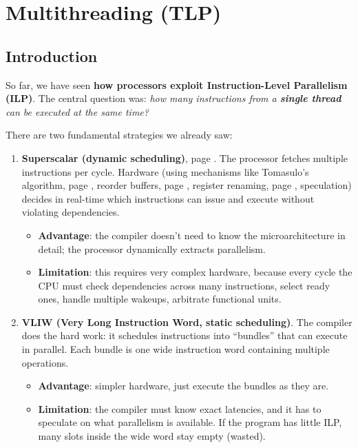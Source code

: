 \section{Multithreading (TLP)}

\subsection{Introduction}

So far, we have seen \textbf{how processors exploit Instruction-Level Parallelism (ILP)}. The central question was: \emph{how many instructions from a \textbf{single thread} can be executed at the same time?}

\highspace
There are two fundamental strategies we already saw:
\begin{enumerate}
    \item \textbf{Superscalar (dynamic scheduling)}, page \pageref{subsubsection: Superscalar Processors}. The processor fetches multiple instructions per cycle. Hardware (using mechanisms like Tomasulo's algorithm, page \pageref{subsection: tomasulo algorithm}, reorder buffers, page \pageref{subsubsection: Reorder Buffer - ROB}, register renaming, page \pageref{subsubsection: Register Renaming}, speculation) decides in real-time which instructions can issue and execute without violating dependencies.
    \begin{itemize}
        \item[\textcolor{Green3}{\faIcon{check}}] \textcolor{Green3}{\textbf{Advantage}}: the compiler doesn't need to know the microarchitecture in detail; the processor dynamically extracts parallelism.
        \item[\textcolor{Red2}{\faIcon{times}}] \textcolor{Red2}{\textbf{Limitation}}: this requires very complex hardware, because every cycle the CPU must check dependencies across many instructions, select ready ones, handle multiple wakeups, arbitrate functional units.
    \end{itemize}

    
    \item \textbf{VLIW (Very Long Instruction Word, static scheduling)}. The compiler does the hard work: it schedules instructions into ``bundles'' that can execute in parallel. Each bundle is one wide instruction word containing multiple operations.
    \begin{itemize}
        \item[\textcolor{Green3}{\faIcon{check}}] \textcolor{Green3}{\textbf{Advantage}}: simpler hardware, just execute the bundles as they are.
        \item[\textcolor{Red2}{\faIcon{times}}] \textcolor{Red2}{\textbf{Limitation}}: the compiler must know exact latencies, and it has to speculate on what parallelism is available. If the program has little ILP, many slots inside the wide word stay empty (wasted).
    \end{itemize}
\end{enumerate}

